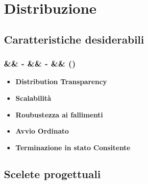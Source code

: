 \documentclass[slidestop,compress,blackandwhite]{beamer}
\newcommand{\itemB}[3]{
	\item \textbf{#1} #2 \vspace{#3}
}
\newcommand{\ii}[1]{\textit{#1}}
\newcommand{\newtitle}[4]{
	#1 
	\ifx&#2&%
	\else
  		\large- #2
	\fi
	\ifx&#3&%
	\else
  		\normalsize- #3
	\fi
	\ifx&#4&%
	\else
  		\normalsize (#4)
	\fi
}
\newcommand{\newframe}[5]{
	\begin{frame}
		\frametitle{\newtitle{#1}{#2}{#3}{#4}}
		#5
	\end{frame}
}
\begin{document}
\section{Distribuzione}

	
	\subsection{Caratteristiche desiderabili}\label{characteristics}
	\newframe{}{}{}{}{
		\vspace{0.5cm}
		\begin{itemize}
			\itemB{Distribution Transparency}{}{0.6cm}
			\itemB{Scalabilità}{}{0.6cm} 
			\itemB{Roubustezza ai fallimenti}{}{0.6cm} 
			\itemB{Avvio Ordinato}{}{0.6cm} 
			\itemB{Terminazione in stato Consitente}{}{0.6cm} 
		\end{itemize}
	}
	
		
%		
%		
%	
%	

%	
%	
%	
	
	\subsection{Scelete progettuali}\label{scelte}
	
\end{document}
